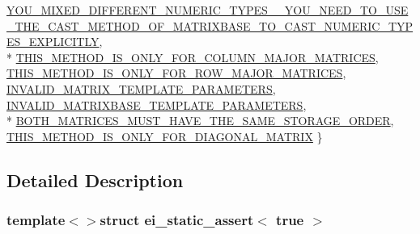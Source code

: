 \begin{DoxyCompactItemize}
\hyperlink{structei__static__assert_3_01true_01_4_ada5f400d6b61aa0566ded13d516502e1ac1abce162c895ab606d0d1c7029be5d6}{Y\-O\-U\-\_\-\-M\-I\-X\-E\-D\-\_\-\-D\-I\-F\-F\-E\-R\-E\-N\-T\-\_\-\-N\-U\-M\-E\-R\-I\-C\-\_\-\-T\-Y\-P\-E\-S\-\_\-\-\_\-\-Y\-O\-U\-\_\-\-N\-E\-E\-D\-\_\-\-T\-O\-\_\-\-U\-S\-E\-\_\-\-T\-H\-E\-\_\-\-C\-A\-S\-T\-\_\-\-M\-E\-T\-H\-O\-D\-\_\-\-O\-F\-\_\-\-M\-A\-T\-R\-I\-X\-B\-A\-S\-E\-\_\-\-T\-O\-\_\-\-C\-A\-S\-T\-\_\-\-N\-U\-M\-E\-R\-I\-C\-\_\-\-T\-Y\-P\-E\-S\-\_\-\-E\-X\-P\-L\-I\-C\-I\-T\-L\-Y}, 
\\*
\hyperlink{structei__static__assert_3_01true_01_4_ada5f400d6b61aa0566ded13d516502e1ad0e8cc2e477e14ffff8596582ecdbd52}{T\-H\-I\-S\-\_\-\-M\-E\-T\-H\-O\-D\-\_\-\-I\-S\-\_\-\-O\-N\-L\-Y\-\_\-\-F\-O\-R\-\_\-\-C\-O\-L\-U\-M\-N\-\_\-\-M\-A\-J\-O\-R\-\_\-\-M\-A\-T\-R\-I\-C\-E\-S}, 
\hyperlink{structei__static__assert_3_01true_01_4_ada5f400d6b61aa0566ded13d516502e1acef31c6d41322279431d5d71e4ac2fb9}{T\-H\-I\-S\-\_\-\-M\-E\-T\-H\-O\-D\-\_\-\-I\-S\-\_\-\-O\-N\-L\-Y\-\_\-\-F\-O\-R\-\_\-\-R\-O\-W\-\_\-\-M\-A\-J\-O\-R\-\_\-\-M\-A\-T\-R\-I\-C\-E\-S}, 
\hyperlink{structei__static__assert_3_01true_01_4_ada5f400d6b61aa0566ded13d516502e1a6a1b11c2ed423a5ce3c4063ebe63ae4d}{I\-N\-V\-A\-L\-I\-D\-\_\-\-M\-A\-T\-R\-I\-X\-\_\-\-T\-E\-M\-P\-L\-A\-T\-E\-\_\-\-P\-A\-R\-A\-M\-E\-T\-E\-R\-S}, 
\hyperlink{structei__static__assert_3_01true_01_4_ada5f400d6b61aa0566ded13d516502e1a1b2639aa43f1edd5a0dd2ac3b1f4cf82}{I\-N\-V\-A\-L\-I\-D\-\_\-\-M\-A\-T\-R\-I\-X\-B\-A\-S\-E\-\_\-\-T\-E\-M\-P\-L\-A\-T\-E\-\_\-\-P\-A\-R\-A\-M\-E\-T\-E\-R\-S}, 
\\*
\hyperlink{structei__static__assert_3_01true_01_4_ada5f400d6b61aa0566ded13d516502e1a3d3781bf0d62c8ce0aa4ff2305566d7c}{B\-O\-T\-H\-\_\-\-M\-A\-T\-R\-I\-C\-E\-S\-\_\-\-M\-U\-S\-T\-\_\-\-H\-A\-V\-E\-\_\-\-T\-H\-E\-\_\-\-S\-A\-M\-E\-\_\-\-S\-T\-O\-R\-A\-G\-E\-\_\-\-O\-R\-D\-E\-R}, 
\hyperlink{structei__static__assert_3_01true_01_4_ada5f400d6b61aa0566ded13d516502e1ac836c3c442201ad1d3b1eb18317c01e9}{T\-H\-I\-S\-\_\-\-M\-E\-T\-H\-O\-D\-\_\-\-I\-S\-\_\-\-O\-N\-L\-Y\-\_\-\-F\-O\-R\-\_\-\-D\-I\-A\-G\-O\-N\-A\-L\-\_\-\-M\-A\-T\-R\-I\-X}
 \}
\end{DoxyCompactItemize}


\subsection{Detailed Description}
\subsubsection*{template$<$$>$struct ei\-\_\-static\-\_\-assert$<$ true $>$}



